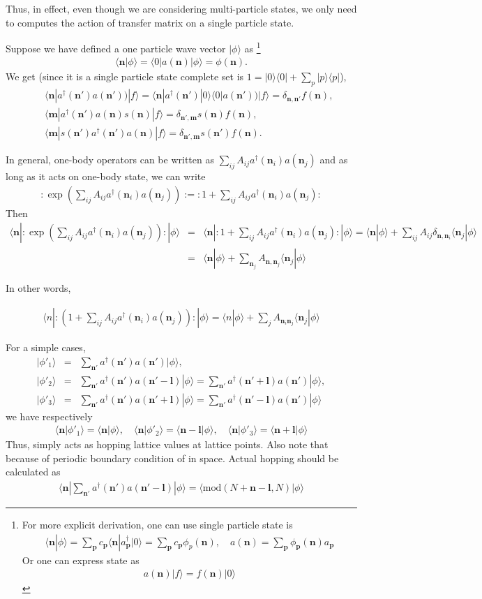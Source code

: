 \documentclass[10pt]{book}
\def\bm{\boldsymbol}
\newcommand{\bea}{\begin{eqnarray}}
\newcommand{\eea}{\end{eqnarray}}
\newcommand{\no}{\nonumber \\}
\def\vl{{\bm l}}
\def\vm{{\bm m}}
\def\vn{{\bm n}}
\def\vp{{\bm p}}
\def\la{\langle}
\def\ra{\rangle}
\begin{document}
Thus, in effect, even though we are considering multi-particle states,
we only need to computes the action of transfer matrix on a single 
particle state. 

Suppose we have defined a one particle wave vector $|\phi\ra $ as 
\footnote{
For more explicit derivation, one can use single particle state is
\bea 
\la \vn|\phi\ra =\sum_{\vp} c_\vp \la \vn|a^\dagger_{\vp}|0\ra = \sum_{\vp} c_\vp \phi_p(\vn),
\quad a(\vn)=\sum_{\vp} \phi_\vp(\vn) a_\vp 
\eea 
Or one can express state as
\bea 
a(\vn)|f\ra=f(\vn)|0\ra 
\eea 
 }
\bea 
\la \vn|\phi\ra = \la 0|a(\vn)|\phi\ra=\phi(\vn). 
\eea 
We get (since it is a single particle state complete set is $1=|0\ra\la 0|+\sum_{p}|p\ra \la p|$),
\bea 
& &\la \vn|a^\dagger(\vn') a(\vn'))|f\ra=\la \vn|a^\dagger(\vn')|0\ra \la 0|a(\vn'))|f\ra
=\delta_{\vn,\vn'}f(\vn), \no 
& &\la \vm|a^\dagger(\vn')a(\vn)s(\vn)|f\ra=\delta_{\vn',\vm} s(\vn) f(\vn) ,\no 
& &\la \vm|s(\vn') a^\dagger(\vn')a(\vn)|f\ra=\delta_{\vn',\vm} s(\vn') f(\vn) .
\eea 

In general, one-body operators can be written as $\sum_{ij} A_{ij} a^\dagger(\vn_i) a(\vn_j)$
and as long as it acts on one-body state, we can write
\bea 
:\exp(\sum_{ij} A_{ij} a^\dagger(\vn_i) a(\vn_j)):=:1+\sum_{ij} A_{ij} a^\dagger(\vn_i) a(\vn_j):
\eea 
Then
\bea 
\la \vn|:\exp(\sum_{ij} A_{ij} a^\dagger(\vn_i) a(\vn_j)):|\phi\ra 
&=&\la \vn|:1+\sum_{ij} A_{ij} a^\dagger(\vn_i) a(\vn_j):|\phi\ra
=\la \vn|\phi\ra+\sum_{ij}A_{ij} \delta_{\vn,\vn_i} \la \vn_j  |\phi\ra \no 
&=&\la \vn|\phi\ra+\sum_{\vn_j} A_{\vn,\vn_j}\la \vn_j  |\phi\ra
\eea  

In other words,
\begin{framed}
\bea 
\la n| : \left(1+\sum_{ij} A_{ij} a^\dagger(\vn_i) a(\vn_j)\right) :|\phi\ra 
=\la n|\phi\ra +\sum_{j} A_{\vn_i \vn_j}\la \vn_j|\phi\ra   
\eea 
\end{framed} 

For a simple cases,
\bea 
|\phi'_1\ra &=& \sum_{\vn'} a^\dagger(\vn')a(\vn')|\phi\ra,\no 
|\phi'_2\ra &=& \sum_{\vn'} a^\dagger(\vn')a(\vn'-\vl)|\phi\ra=\sum_{\vn'} a^\dagger(\vn'+\vl)a(\vn')|\phi\ra,\no    
|\phi'_3\ra &=& \sum_{\vn'} a^\dagger(\vn')a(\vn'+\vl)|\phi\ra=\sum_{\vn'} a^\dagger(\vn'-\vl)a(\vn')|\phi\ra
\eea 
we have respectively 
\bea 
\la \vn|\phi'_1\ra =\la \vn|\phi\ra ,\quad \la \vn|\phi'_2\ra =\la \vn-\vl|\phi\ra,\quad 
\la \vn|\phi'_3\ra =\la \vn+\vl|\phi\ra  
\eea 
Thus, simply acts as hopping lattice values at lattice points. 
Also note that because of periodic boundary condition of in space.
Actual hopping should be calculated as
\bea 
\la \vn|\sum_{\vn'} a^\dagger(\vn') a(\vn'-\vl)|\phi\ra 
= \la \mbox{mod}(N+\vn -\vl,N)|\phi\ra  
\eea 
\end{document}
